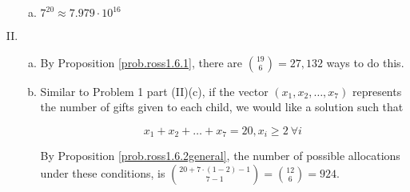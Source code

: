 \begin{enumerate}[(I)]
\begin{enumerate}[(a)]

\item \(\boxed{7^{20} \approx 7.979 \cdot 10^{16}} \)

\end{enumerate}

\item

\begin{enumerate}[(a)]

\item 


By Proposition \ref{prob.ross1.6.1}, there are \(\binom{19}{6} = \boxed{27,132}\) ways to do this. 


\item Similar to Problem 1 part (II)(c), if the vector \((x_1, x_2, \ldots, x_{7})\) represents the number of gifts given to each child, we would like a solution such that

\[
x_1 + x_2 + \ldots + x_7 = 20, x_i \geq 2 \ \forall i
\]

By Proposition \ref{prob.ross1.6.2general}, the number of possible allocations under these conditions, is \(\binom{20 + 7\cdot(1-2)-1}{7-1} = \binom{12}{6} = \boxed{924} \).

%
%
%
%


\end{enumerate}
\end{enumerate}
